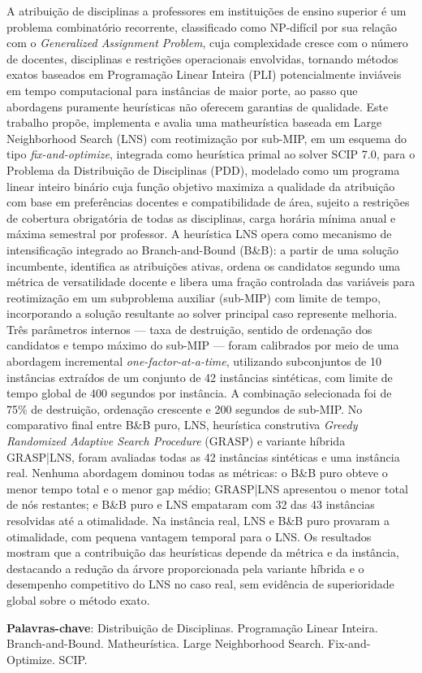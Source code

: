 \begin{resumo} %

A atribuição de disciplinas a professores em instituições de ensino superior é um problema combinatório recorrente, classificado como NP-difícil por sua relação com o \textit{Generalized Assignment Problem}, cuja complexidade cresce com o número de docentes, disciplinas e restrições operacionais envolvidas, tornando métodos exatos baseados em Programação Linear Inteira (PLI) potencialmente inviáveis em tempo computacional para instâncias de maior porte, ao passo que abordagens puramente heurísticas não oferecem garantias de qualidade. Este trabalho propõe, implementa e avalia uma matheurística baseada em Large Neighborhood Search (LNS) com reotimização por sub-MIP, em um esquema do tipo \textit{fix-and-optimize}, integrada como heurística primal ao solver SCIP 7.0, para o Problema da Distribuição de Disciplinas (PDD), modelado como um programa linear inteiro binário cuja função objetivo maximiza a qualidade da atribuição com base em preferências docentes e compatibilidade de área, sujeito a restrições de cobertura obrigatória de todas as disciplinas, carga horária mínima anual e máxima semestral por professor. A heurística LNS opera como mecanismo de intensificação integrado ao Branch-and-Bound (B\&B): a partir de uma solução incumbente, identifica as atribuições ativas, ordena os candidatos segundo uma métrica de versatilidade docente e libera uma fração controlada das variáveis para reotimização em um subproblema auxiliar (sub-MIP) com limite de tempo, incorporando a solução resultante ao solver principal caso represente melhoria. Três parâmetros internos --- taxa de destruição, sentido de ordenação dos candidatos e tempo máximo do sub-MIP --- foram calibrados por meio de uma abordagem incremental \textit{one-factor-at-a-time}, utilizando subconjuntos de 10 instâncias extraídos de um conjunto de 42 instâncias sintéticas, com limite de tempo global de 400 segundos por instância. A combinação selecionada foi de 75\% de destruição, ordenação crescente e 200 segundos de sub-MIP. No comparativo final entre B\&B puro, LNS, heurística construtiva \textit{Greedy Randomized Adaptive Search Procedure} (GRASP) e variante híbrida GRASP|LNS, foram avaliadas todas as 42 instâncias sintéticas e uma instância real. Nenhuma abordagem dominou todas as métricas: o B\&B puro obteve o menor tempo total e o menor gap médio; GRASP|LNS apresentou o menor total de nós restantes; e B\&B puro e LNS empataram com 32 das 43 instâncias resolvidas até a otimalidade. Na instância real, LNS e B\&B puro provaram a otimalidade, com pequena vantagem temporal para o LNS. Os resultados mostram que a contribuição das heurísticas depende da métrica e da instância, destacando a redução da árvore proporcionada pela variante híbrida e o desempenho competitivo do LNS no caso real, sem evidência de superioridade global sobre o método exato.

\noindent
    {\sloppy \textbf{Palavras-chave}: Distribuição de Disciplinas. Programação Linear Inteira. Branch-and-Bound. Matheurística. Large Neighborhood Search. Fix-and-Optimize. SCIP.\par}\fussy
\end{resumo} %
